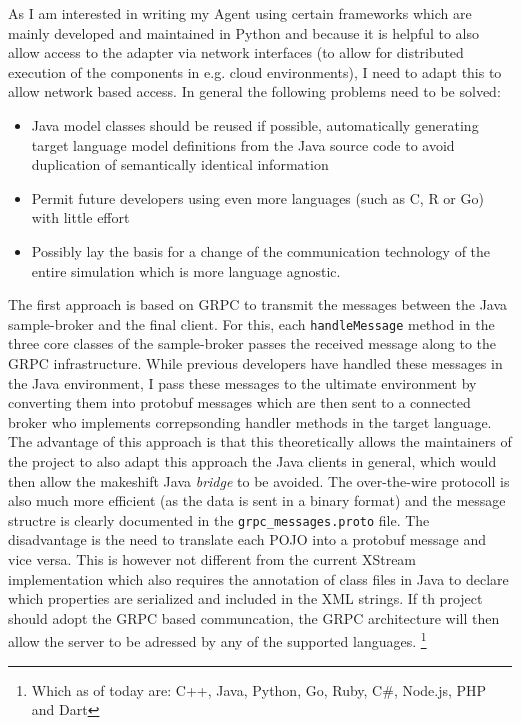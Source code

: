 As I am interested in writing my Agent using certain frameworks which are mainly developed and maintained in Python and
because it is helpful to also allow access to the adapter via network interfaces (to allow for distributed execution of
the components in e.g. cloud environments), I need to adapt this to allow network based access. In general the following
problems need to be solved:

\begin{itemize} \item Java model classes should be reused if possible, automatically generating target language model
	definitions from the Java source code to avoid duplication of semantically identical information \item Permit
	future developers using even more languages (such as C, R or Go) with little effort \item Possibly lay the basis
	for a change of the communication technology of the entire simulation which is more language agnostic.
	\end{itemize}

The first approach is based on \ac{GRPC} to transmit the messages between the Java sample-broker and the final client.
For this, each \texttt{handleMessage} method in the three core classes of the sample-broker passes the received message
along to the \ac {GRPC} infrastructure. While previous developers have handled these messages in the Java environment, I
pass these messages to the ultimate environment by converting them into protobuf messages which are then sent to a
connected broker who implements correpsonding handler methods in the target language. The advantage of this approach is
that this theoretically allows the maintainers of the project to also adapt this approach the Java clients in general,
which would then allow the makeshift Java \emph{bridge} to be avoided. The over-the-wire protocoll is also much more
efficient (as the data is sent in a binary format) and the message structre is clearly documented in the
\texttt{grpc\_messages.proto} file. The disadvantage is the need to translate each \ac{POJO} into a protobuf message and
vice versa. This is however not different from the current XStream implementation which also requires the annotation of
class files in Java to declare which properties are serialized and included in the \ac {XML} strings. If th project
should adopt the \ac {GRPC} based communcation, the \ac {GRPC} architecture will then allow the server to be adressed by
any of the supported languages.  \footnote{Which as of today are: C++, Java, Python, Go, Ruby, C\#, Node.js, PHP and
Dart}

